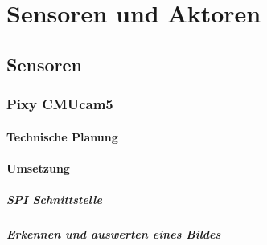 \chapter{Sensoren und Aktoren}
\renewcommand{\kapitelautor}{Autor: Lucas Ullrich}

\section{Sensoren}

  \subsection{Pixy CMUcam5}

    \subsubsection{Technische Planung}

    \subsubsection{Umsetzung}

      \paragraph{SPI Schnittstelle}

      \paragraph{Erkennen und auswerten eines Bildes}

    \subsubsection{}
